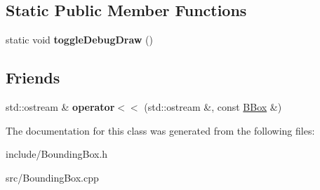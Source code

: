 \subsection*{Static Public Member Functions}
\begin{DoxyCompactItemize}
\item 
\hypertarget{classGame_1_1BBox_a69533cabd4443cd8d4970f8a69363e60}{static void {\bfseries toggle\-Debug\-Draw} ()}\label{classGame_1_1BBox_a69533cabd4443cd8d4970f8a69363e60}

\end{DoxyCompactItemize}
\subsection*{Friends}
\begin{DoxyCompactItemize}
\item 
\hypertarget{classGame_1_1BBox_a4485cfb9ea2c7b57d3cfa93a06049b27}{std\-::ostream \& {\bfseries operator$<$$<$} (std\-::ostream \&, const \hyperlink{classGame_1_1BBox}{B\-Box} \&)}\label{classGame_1_1BBox_a4485cfb9ea2c7b57d3cfa93a06049b27}

\end{DoxyCompactItemize}


The documentation for this class was generated from the following files\-:\begin{DoxyCompactItemize}
\item 
include/Bounding\-Box.\-h\item 
src/Bounding\-Box.\-cpp\end{DoxyCompactItemize}
